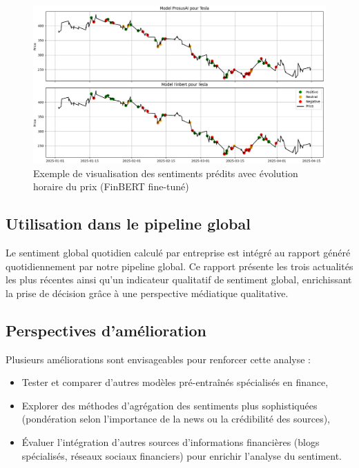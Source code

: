 \documentclass[a4paper,12pt]{article}
\begin{document}
\begin{figure}[h!]
    \centering
    \includegraphics[width=\textwidth]{Model Comparison.png}
    \caption{Exemple de visualisation des sentiments prédits avec évolution horaire du prix (FinBERT fine-tuné)}
    \label{fig:sentiment_visualization}
\end{figure}

\subsection*{Utilisation dans le pipeline global}

Le sentiment global quotidien calculé par entreprise est intégré au rapport généré quotidiennement par notre pipeline global. Ce rapport présente les trois actualités les plus récentes ainsi qu’un indicateur qualitatif de sentiment global, enrichissant la prise de décision grâce à une perspective médiatique qualitative.

\subsection*{Perspectives d'amélioration}

Plusieurs améliorations sont envisageables pour renforcer cette analyse :
\begin{itemize}
    \item Tester et comparer d'autres modèles pré-entraînés spécialisés en finance,
    \item Explorer des méthodes d'agrégation des sentiments plus sophistiquées (pondération selon l’importance de la news ou la crédibilité des sources),
    \item Évaluer l’intégration d’autres sources d’informations financières (blogs spécialisés, réseaux sociaux financiers) pour enrichir l’analyse du sentiment.
\end{itemize}
\end{document}

